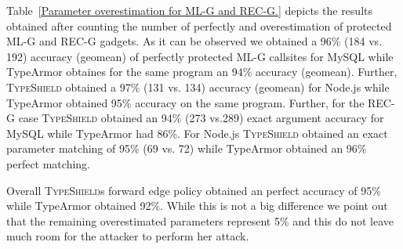 \begin{table}[H]
\centering 
{}
\caption{Parameter overestimation for ML-G and REC-G.}
\label{Parameter overestimation for ML-G and REC-G.}

\vspace{-.5cm}
\end{table}
Table~\ref{Parameter overestimation for ML-G and REC-G.} depicts the results obtained
after counting the number of perfectly and overestimation of protected ML-G and 
REC-G gadgets. As it can be observed we obtained a
96\% (184 vs. 192) accuracy (geomean) of perfectly protected ML-G callsites for MySQL while
TypeArmor obtaines for the same program an 94\% accuracy (geomean). Further,
\textsc{TypeShield} obtained a 97\% (131 vs. 134) accuracy (geomean) for Node.js while TypeArmor
obtained 95\% accuracy on the same program.
Further, for the REC-G case \textsc{TypeShield} obtained an
94\% (273 vs.289) exact argument accuracy for MySQL while TypeArmor had 86\%.
For Node.js \textsc{TypeShield} obtained an exact parameter 
matching of 95\% (69 vs. 72) while TypeArmor obtained an 96\% perfect matching.

Overall \textsc{TypeShield}s forward edge policy obtained an perfect accuracy 
of 95\% while TypeArmor obtained 92\%. While this is not a big difference
we point out that the remaining overestimated parameters represent 5\% and this 
do not leave much room for the attacker to perform her attack.

